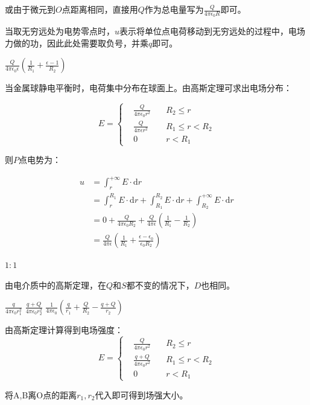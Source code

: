 \documentclass[b5paper,opensource,sourcefont,parskip]{qyxf-book}
\newcommand{\di}[1]{\mathrm{d}#1}
\begin{document}
或由于微元到$O$点距离相同，直接用$Q$作为总电量写为$\frac{Q}{4\pi\epsilon_0 R}$即可。

当取无穷远处为电势零点时，$ u $表示将单位点电荷移动到无穷远处的过程中，电场力做的功，因此此处需要取负号，并乘$q$即可。

 $\frac{Q}{4\pi\epsilon_0\epsilon}\left(\frac{1}{R_1}+\frac{\epsilon-1}{R_2}\right)$

\solve 当金属球静电平衡时，电荷集中分布在球面上。由高斯定理可求出电场分布：

\begin{equation}
E=\left\{
\begin{aligned}
&\frac{Q}{4\pi\epsilon_0 r^2}\quad &R_2\leqslant r\\
&\frac{Q}{4\pi\epsilon r^2}\quad &R_1\leqslant r<R_2\\
&0	&r<R_1
\end{aligned}
\right.
\end{equation}

则$ P $点电势为：

\begin{align*}
u&=\int_r^{+\infty}E\cdot\di{r}\\
&=\int_r^{R_1}E\cdot\di{r}+\int_{R_1}^{R_2}E\cdot\di{r}+\int_{R_2}^{+\infty}E\cdot\di{r}\\
&=0+\frac{Q}{4\pi\epsilon_0 R_2}+\frac{Q}{4\pi\epsilon}\left(\frac{1}{R_1}-\frac{1}{R_2}\right)\\
&=\frac{Q}{4\pi\epsilon}\left(\frac{1}{R_1}+\frac{\epsilon-\epsilon_0}{\epsilon_0R_2}\right)
\end{align*}

 $1:1$

\solve 由电介质中的高斯定理，在$ Q $和$ S $都不变的情况下，$ D $也相同。

 $\frac{q}{4\pi \epsilon_0 r_1^2}$ \quad $\frac{q+Q}{4\pi\epsilon_0 r_2^2}$ \quad $\frac{1}{4\pi\epsilon_0}\left(\frac{q}{r_1}+\frac{Q}{R_2}-\frac{q+Q}{r_2}\right)$

\solve 由高斯定理计算得到电场强度：
\begin{equation}
E=\left\{
\begin{aligned}
&\frac{Q}{4\pi\epsilon_0 r^2}\quad &R_2\leqslant r\\
&\frac{q+Q}{4\pi\epsilon_0 r^2}\quad &R_1\leqslant r<R_2\\
&0	&r<R_1
\end{aligned}
\right.
\end{equation}

将A,B离O点的距离$ r_1,r_2 $代入即可得到场强大小。
\end{document}
